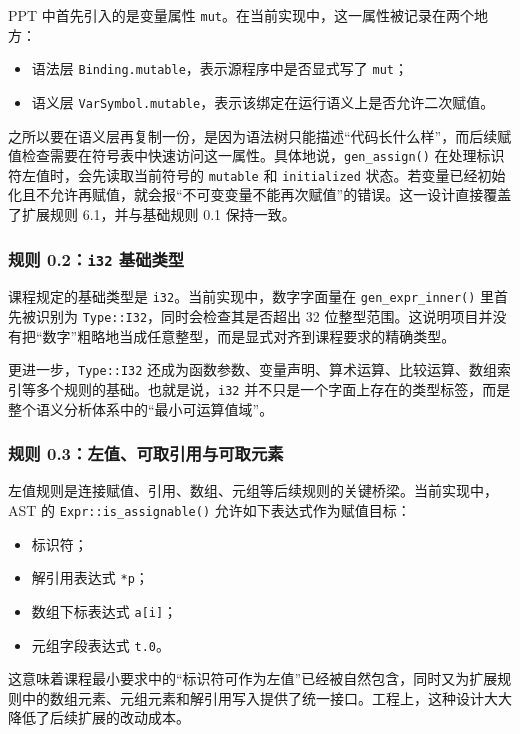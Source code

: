 \documentclass[UTF8,a4paper,12pt]{ctexart}
\newcommand{\pkg}[1]{\texttt{#1}}
\begin{document}
PPT 中首先引入的是变量属性 \pkg{mut}。在当前实现中，这一属性被记录在两个地方：

\begin{itemize}
    \item 语法层 \pkg{Binding.mutable}，表示源程序中是否显式写了 \pkg{mut}；
    \item 语义层 \pkg{VarSymbol.mutable}，表示该绑定在运行语义上是否允许二次赋值。
\end{itemize}

之所以要在语义层再复制一份，是因为语法树只能描述“代码长什么样”，而后续赋值检查需要在符号表中快速访问这一属性。具体地说，\pkg{gen\_assign()} 在处理标识符左值时，会先读取当前符号的 \pkg{mutable} 和 \pkg{initialized} 状态。若变量已经初始化且不允许再赋值，就会报“不可变变量不能再次赋值”的错误。这一设计直接覆盖了扩展规则 6.1，并与基础规则 0.1 保持一致。

\subsubsection{规则 0.2：\pkg{i32} 基础类型}

课程规定的基础类型是 \pkg{i32}。当前实现中，数字字面量在 \pkg{gen\_expr\_inner()} 里首先被识别为 \pkg{Type::I32}，同时会检查其是否超出 32 位整型范围。这说明项目并没有把“数字”粗略地当成任意整型，而是显式对齐到课程要求的精确类型。

更进一步，\pkg{Type::I32} 还成为函数参数、变量声明、算术运算、比较运算、数组索引等多个规则的基础。也就是说，\pkg{i32} 并不只是一个字面上存在的类型标签，而是整个语义分析体系中的“最小可运算值域”。

\subsubsection{规则 0.3：左值、可取引用与可取元素}

左值规则是连接赋值、引用、数组、元组等后续规则的关键桥梁。当前实现中，AST 的 \pkg{Expr::is\_assignable()} 允许如下表达式作为赋值目标：

\begin{itemize}
    \item 标识符；
    \item 解引用表达式 \pkg{*p}；
    \item 数组下标表达式 \pkg{a[i]}；
    \item 元组字段表达式 \pkg{t.0}。
\end{itemize}

这意味着课程最小要求中的“标识符可作为左值”已经被自然包含，同时又为扩展规则中的数组元素、元组元素和解引用写入提供了统一接口。工程上，这种设计大大降低了后续扩展的改动成本。
\end{document}
